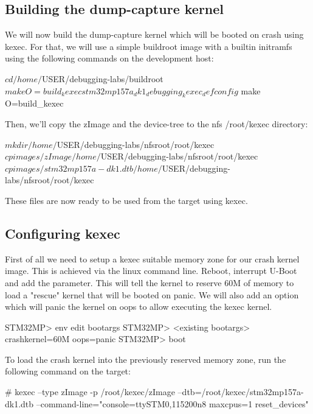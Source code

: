 \subsection{Building the dump-capture kernel}

We will now build the dump-capture kernel which will be booted on crash using
kexec. For that, we will use a simple buildroot image with a builtin initramfs
using the following commands on the development host:

\begin{bashinput}
$ cd /home/$USER/debugging-labs/buildroot
$ make O=build_kexec stm32mp157a_dk1_debugging_kexec_defconfig
$ make O=build_kexec
\end{bashinput}

Then, we'll copy the zImage and the device-tree to the nfs /root/kexec
directory:

\begin{bashinput}
$ mkdir /home/$USER/debugging-labs/nfsroot/root/kexec
$ cp images/zImage /home/$USER/debugging-labs/nfsroot/root/kexec
$ cp images/stm32mp157a-dk1.dtb /home/$USER/debugging-labs/nfsroot/root/kexec
\end{bashinput}

These files are now ready to be used from the target using kexec.

\subsection{Configuring kexec}

First of all we need to setup a kexec suitable memory zone for our crash kernel
image. This is achieved via the linux command line. Reboot, interrupt U-Boot and
add the  parameter. This will tell the kernel to reserve
60M of memory to load a "rescue" kernel that will be booted on panic. We will
also add an option which will panic the kernel on oops to allow executing the
kexec kernel.

\begin{bashinput}
STM32MP> env edit bootargs
STM32MP> <existing bootargs> crashkernel=60M oops=panic
STM32MP> boot
\end{bashinput}

To load the crash kernel into the previously reserved memory zone, run the
following command on the target:

\begin{bashinput}
# kexec --type zImage -p /root/kexec/zImage --dtb=/root/kexec/stm32mp157a-dk1.dtb
  --command-line="console=ttySTM0,115200n8 maxcpus=1 reset_devices"
\end{bashinput}

